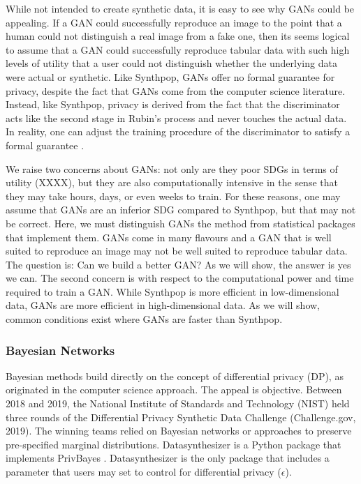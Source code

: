 \documentclass[runningheads]{llncs}
\begin{document}
While not intended to create synthetic data, it is easy to see why GANs could be appealing.  If a GAN could successfully reproduce an image to the point that a human could not distinguish a real image from a fake one, then its seems logical to assume that a GAN could successfully reproduce tabular data with such high levels of utility that a user could not distinguish whether the underlying data were actual or synthetic.  Like Synthpop, GANs offer no formal guarantee for privacy, despite the fact that GANs come from the computer science literature.  Instead, like Synthpop, privacy is derived from the fact that the discriminator acts like the second stage in Rubin's process and never touches the actual data.  In reality, one can adjust the training procedure of the discriminator to satisfy a formal guarantee \citep{beaulieu2019privacy,neunhoeffer2020private}.

We raise two concerns about GANs: not only are they poor SDGs in terms of utility (XXXX), but they are also computationally intensive in the sense that they may take hours, days, or even weeks to train.  For these reasons, one may assume that GANs are an inferior SDG compared to Synthpop, but that may not be correct.  Here, we must distinguish GANs the method from statistical packages that implement them.  GANs come in many flavours and a GAN that is well suited to reproduce an image may not be well suited to reproduce tabular data.  The question is: Can we build a better GAN?  As we will show, the answer is yes we can.  The second concern is with respect to the computational power and time required to train a GAN.  While Synthpop is more efficient in low-dimensional data, GANs are more efficient in high-dimensional data.  As we will show, common conditions exist where GANs are faster than Synthpop.

\subsubsection{Bayesian Networks}

Bayesian methods build directly on the concept of differential privacy (DP), as originated in the computer science approach.  The appeal is objective.  Between 2018 and 2019, the National Institute of Standards and Technology (NIST) held three rounds of the Differential Privacy Synthetic Data Challenge (Challenge.gov, 2019).  The winning teams relied on Bayesian networks or approaches to preserve pre-specified marginal distributions.  Datasynthesizer is a Python package that implements PrivBayes \citep{zhang2017privbayes}.  Datasynthesizer is the only package that includes a parameter that users may set to control for differential privacy ($\epsilon$).  
\end{document}
